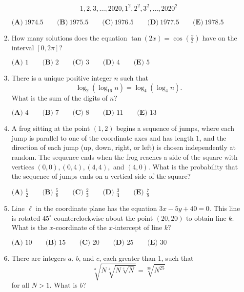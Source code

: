 \documentclass{article}
\begin{document}
\begin{enumerate}[label=\arabic*., itemsep=0.5em]
\begin{equation*}
1, 2, 3, \ldots, 2020, 1^2, 2^2, 3^2, \ldots, 2020^2
\end{equation*}

\( \textbf{(A)}\ 1974.5\qquad\textbf{(B)}\ 1975.5\qquad\textbf{(C)}\ 1976.5\qquad\textbf{(D)}\ 1977.5\qquad\textbf{(E)}\ 1978.5 \)\par \vspace{0.5em}\item How many solutions does the equation \(\tan{(2x)} = \cos{(\tfrac{x}{2})}\) have on the interval \([0, 2\pi]?\)

\(\textbf{(A) } 1 \qquad \textbf{(B) } 2 \qquad \textbf{(C) } 3 \qquad \textbf{(D) } 4 \qquad \textbf{(E) } 5\)\par \vspace{0.5em}\item There is a unique positive integer \(n\) such that
\begin{equation*}
\log_2{(\log_{16}{n})} = \log_4{(\log_4{n})}.
\end{equation*}
What is the sum of the digits of \(n?\)

\(\textbf{(A) } 4 \qquad \textbf{(B) } 7 \qquad \textbf{(C) } 8 \qquad \textbf{(D) } 11 \qquad \textbf{(E) } 13\)\par \vspace{0.5em}\item A frog sitting at the point \((1, 2)\) begins a sequence of jumps, where each jump is parallel to one of the coordinate axes and has length \(1\), and the direction of each jump (up, down, right, or left) is chosen independently at random. The sequence ends when the frog reaches a side of the square with vertices \((0,0), (0,4), (4,4),\) and \((4,0)\). What is the probability that the sequence of jumps ends on a vertical side of the square\(?\)

\(\textbf{(A) } \frac{1}{2} \qquad \textbf{(B) } \frac{5}{8} \qquad \textbf{(C) } \frac{2}{3} \qquad \textbf{(D) } \frac{3}{4} \qquad \textbf{(E) } \frac{7}{8}\)\par \vspace{0.5em}\item Line \(\ell\) in the coordinate plane has the equation \(3x - 5y + 40 = 0\). This line is rotated \(45^{\circ}\) counterclockwise about the point \((20, 20)\) to obtain line \(k\). What is the \(x\)-coordinate of the \(x\)-intercept of line \(k?\)

\(\textbf{(A) } 10 \qquad \textbf{(B) } 15 \qquad \textbf{(C) } 20 \qquad \textbf{(D) } 25 \qquad \textbf{(E) } 30\)\par \vspace{0.5em}\item There are integers \(a\), \(b\), and \(c\), each greater than 1, such that
\begin{equation*}
\sqrt[a]{N \sqrt[b]{N \sqrt[c]{N}}} = \sqrt[36]{N^{25}}
\end{equation*}
for all \(N > 1\). What is \(b\)?


\end{enumerate}
\end{document}
